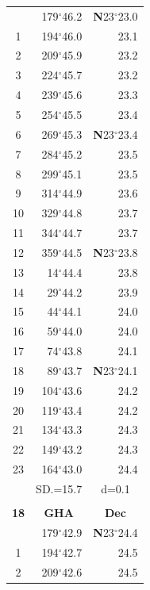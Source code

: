\documentclass[10pt, a4paper]{report}
\begin{document}
\begin{scriptsize}
\begin{tabular*}{0.2\textwidth}[t]{@{\extracolsep{\fill}}|c|rr|}
\hline\rule{0pt}{2.6ex}\noindent
0 & 179$^\circ$46.2 & \textbf{N}23$^\circ$23.0\\
1 & 194$^\circ$46.0 & 23.1\\
2 & 209$^\circ$45.9 & 23.2\\
3 & 224$^\circ$45.7 & \raisebox{0.24ex}{\boldmath$\cdot$~\boldmath$\cdot$~~}23.2\\
4 & 239$^\circ$45.6 & 23.3\\
5 & 254$^\circ$45.5 & 23.4\\[2Pt]
6 & 269$^\circ$45.3 & \textbf{N}23$^\circ$23.4\\
7 & 284$^\circ$45.2 & 23.5\\
8 & 299$^\circ$45.1 & 23.5\\
9 & 314$^\circ$44.9 & \raisebox{0.24ex}{\boldmath$\cdot$~\boldmath$\cdot$~~}23.6\\
10 & 329$^\circ$44.8 & 23.7\\
11 & 344$^\circ$44.7 & 23.7\\[2Pt]
12 & 359$^\circ$44.5 & \textbf{N}23$^\circ$23.8\\
13 & 14$^\circ$44.4 & 23.8\\
14 & 29$^\circ$44.2 & 23.9\\
15 & 44$^\circ$44.1 & \raisebox{0.24ex}{\boldmath$\cdot$~\boldmath$\cdot$~~}24.0\\
16 & 59$^\circ$44.0 & 24.0\\
17 & 74$^\circ$43.8 & 24.1\\[2Pt]
18 & 89$^\circ$43.7 & \textbf{N}23$^\circ$24.1\\
19 & 104$^\circ$43.6 & 24.2\\
20 & 119$^\circ$43.4 & 24.2\\
21 & 134$^\circ$43.3 & \raisebox{0.24ex}{\boldmath$\cdot$~\boldmath$\cdot$~~}24.3\\
22 & 149$^\circ$43.2 & 24.3\\
23 & 164$^\circ$43.0 & 24.4\\
\hline
\rule{0pt}{2.4ex} & \multicolumn{1}{c}{SD.=15.7} & \multicolumn{1}{c|}{d=0.1}\\
\hline
\multicolumn{1}{c}{}\\[-0.5ex]\hline
\multicolumn{1}{|c|}{\rule{0pt}{2.6ex}\textbf{18}} & \multicolumn{1}{c}{\textbf{GHA}} & \multicolumn{1}{c|}{\textbf{Dec}}\\
\hline\rule{0pt}{2.6ex}\noindent
0 & 179$^\circ$42.9 & \textbf{N}23$^\circ$24.4\\
1 & 194$^\circ$42.7 & 24.5\\
2 & 209$^\circ$42.6 & 24.5\\

\end{tabular*}
\end{scriptsize}
\end{document}
